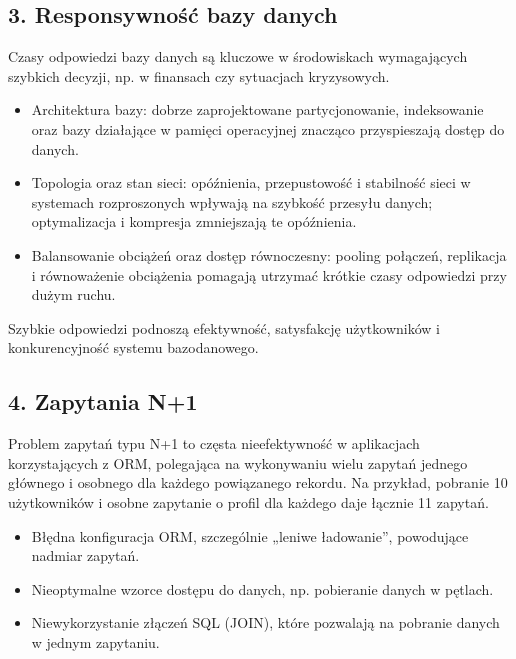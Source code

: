 \documentclass[a4paper,11pt,openany,english]{sphinxmanual}
\begin{document}
\subsection{3. Responsywność bazy danych}
\label{\detokenize{rozdzial2/index:responsywnosc-bazy-danych}}
\sphinxAtStartPar
Czasy odpowiedzi bazy danych są kluczowe w środowiskach wymagających szybkich decyzji, np. w finansach czy sytuacjach kryzysowych.
\begin{description}
\begin{itemize}
\item {} 
\sphinxAtStartPar
Architektura bazy: dobrze zaprojektowane partycjonowanie, indeksowanie oraz bazy działające w pamięci operacyjnej znacząco przyspieszają dostęp do danych.

\item {} 
\sphinxAtStartPar
Topologia oraz stan sieci: opóźnienia, przepustowość i stabilność sieci w systemach rozproszonych wpływają na szybkość przesyłu danych; optymalizacja i kompresja zmniejszają te opóźnienia.

\item {} 
\sphinxAtStartPar
Balansowanie obciążeń oraz dostęp równoczesny: pooling połączeń, replikacja i równoważenie obciążenia pomagają utrzymać krótkie czasy odpowiedzi przy dużym ruchu.

\end{itemize}

\end{description}

\sphinxAtStartPar
Szybkie odpowiedzi podnoszą efektywność, satysfakcję użytkowników i konkurencyjność systemu bazodanowego.


\subsection{4. Zapytania N+1}
\label{\detokenize{rozdzial2/index:zapytania-n-1}}
\sphinxAtStartPar
Problem zapytań typu N+1 to częsta nieefektywność w aplikacjach korzystających z ORM, polegająca na wykonywaniu wielu zapytań \textendash{} jednego głównego i osobnego dla każdego powiązanego rekordu. Na przykład, pobranie 10 użytkowników i osobne zapytanie o profil dla każdego daje łącznie 11 zapytań.
\begin{description}
\begin{itemize}
\item {} 
\sphinxAtStartPar
Błędna konfiguracja ORM, szczególnie „leniwe ładowanie”, powodujące nadmiar zapytań.

\item {} 
\sphinxAtStartPar
Nieoptymalne wzorce dostępu do danych, np. pobieranie danych w pętlach.

\item {} 
\sphinxAtStartPar
Niewykorzystanie złączeń SQL (JOIN), które pozwalają na pobranie danych w jednym zapytaniu.

\end{itemize}

\end{description}
\end{document}
